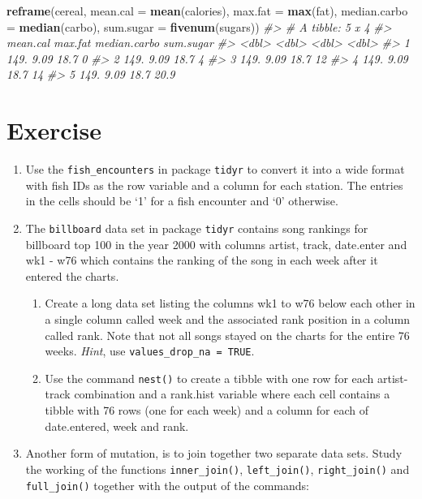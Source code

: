 \documentclass[
]{book}
\newenvironment{Shaded}{\begin{snugshade}}{\end{snugshade}}
\newcommand{\AttributeTok}[1]{\textcolor[rgb]{0.13,0.29,0.53}{#1}}
\newcommand{\CommentTok}[1]{\textcolor[rgb]{0.56,0.35,0.01}{\textit{#1}}}
\newcommand{\FunctionTok}[1]{\textcolor[rgb]{0.13,0.29,0.53}{\textbf{#1}}}
\newcommand{\NormalTok}[1]{#1}
\begin{document}
\begin{Shaded}
\begin{Highlighting}[]
\FunctionTok{reframe}\NormalTok{(cereal, }\AttributeTok{mean.cal =} \FunctionTok{mean}\NormalTok{(calories), }\AttributeTok{max.fat =} \FunctionTok{max}\NormalTok{(fat), }
          \AttributeTok{median.carbo =} \FunctionTok{median}\NormalTok{(carbo), }\AttributeTok{sum.sugar =} \FunctionTok{fivenum}\NormalTok{(sugars))}
\CommentTok{\#\textgreater{} \# A tibble: 5 x 4}
\CommentTok{\#\textgreater{}   mean.cal max.fat median.carbo sum.sugar}
\CommentTok{\#\textgreater{}      \textless{}dbl\textgreater{}   \textless{}dbl\textgreater{}        \textless{}dbl\textgreater{}     \textless{}dbl\textgreater{}}
\CommentTok{\#\textgreater{} 1     149.    9.09         18.7       0  }
\CommentTok{\#\textgreater{} 2     149.    9.09         18.7       4  }
\CommentTok{\#\textgreater{} 3     149.    9.09         18.7      12  }
\CommentTok{\#\textgreater{} 4     149.    9.09         18.7      14  }
\CommentTok{\#\textgreater{} 5     149.    9.09         18.7      20.9}
\end{Highlighting}
\end{Shaded}

\section{Exercise}\label{exercise-14}

\begin{enumerate}
\def\labelenumi{\arabic{enumi}.}
\item
  Use the \texttt{fish\_encounters} in package \texttt{tidyr} to convert it into a wide format with fish IDs as the row variable and a column for each station. The entries in the cells should be `1' for a fish encounter and `0' otherwise.
\item
  The \texttt{billboard} data set in package \texttt{tidyr} contains song rankings for billboard top 100 in the year 2000 with columns artist, track, date.enter and wk1 - w76 which contains the ranking of the song in each week after it entered the charts.

  \begin{enumerate}
  \def\labelenumii{(\alph{enumii})}
  \item
    Create a long data set listing the columns wk1 to w76 below each other in a single column called week and the associated rank position in a column called rank. Note that not all songs stayed on the charts for the entire 76 weeks. \emph{Hint}, use \texttt{values\_drop\_na\ =\ TRUE}.
  \item
    Use the command \texttt{nest()} to create a tibble with one row for each artist-track combination and a rank.hist variable where each cell contains a tibble with 76 rows (one for each week) and a column for each of date.entered, week and rank.
  \end{enumerate}
\item
  Another form of mutation, is to join together two separate data sets. Study the working of the functions \texttt{inner\_join()}, \texttt{left\_join()}, \texttt{right\_join()} and \texttt{full\_join()} together with the output of the commands:
\end{enumerate}
\end{document}

